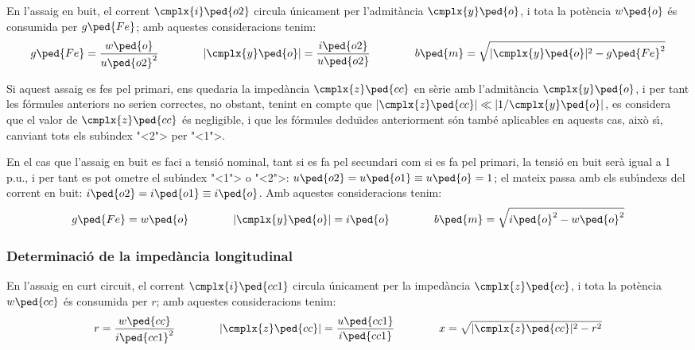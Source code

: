 En l'assaig en buit, el corrent $\cmplx{i}\ped{o2}$ circula
\'{u}nicament per l'admit\`{a}ncia $\cmplx{y}\ped{o}$, i tota la pot\`{e}ncia
$w\ped{o}$ \'{e}s consumida per $g\ped{Fe}$; amb aquestes consideracions
tenim:
\begin{equation}
    g\ped{Fe} = \frac{w\ped{o}}{u\ped{o2}^2} \qquad\qquad
    |\cmplx{y}\ped{o}| = \frac{i\ped{o2}}{u\ped{o2}}
    \qquad\qquad
    b\ped{m} = \sqrt{|\cmplx{y}\ped{o}|^2 - g\ped{Fe}^2}
\end{equation}

Si aquest assaig es fes pel primari, ens quedaria la imped\`{a}ncia
$\cmplx{z}\ped{cc}$ en s\`{e}rie amb l'admit\`{a}ncia $\cmplx{y}\ped{o}$, i
per tant les f\'{o}rmules anteriors no serien correctes, no obstant,
tenint en compte que $|\cmplx{z}\ped{cc}| \ll |1/\cmplx{y}\ped{o}|$,
es  considera que el valor de $\cmplx{z}\ped{cc}$ \'{e}s negligible, i
que les f\'{o}rmules dedu\"{\i}des anteriorment s\'{o}n tamb\'{e} aplicables en
aquests cas, aix\`{o} s\'{\i}, canviant tots els sub\'{\i}ndex {"<}2{">} per {"<}1{">}.

En el cas que l'assaig en buit es faci a tensi\'{o} nominal, tant  si es
fa pel secundari com si es fa pel primari, la tensi\'{o} en buit ser\`{a}
igual a 1 p.u., i per tant es pot ometre el sub\'{\i}ndex {"<}1{">} o {"<}2{">}:
$u\ped{o2} = u\ped{o1} \equiv u\ped{o} = 1$; el mateix passa amb els
sub\'{\i}ndexs del corrent en buit: $i\ped{o2} = i\ped{o1} \equiv
i\ped{o}$. Amb aquestes consideracions tenim:
\begin{equation}
    g\ped{Fe} = w\ped{o} \qquad\qquad
    |\cmplx{y}\ped{o}| = i\ped{o} \qquad\qquad
    b\ped{m} = \sqrt{i\ped{o}^2 - w\ped{o}^2}
\end{equation}

\subsubsection{Determinaci\'{o} de la imped\`{a}ncia longitudinal}

En l'assaig en curt circuit, el corrent $\cmplx{i}\ped{cc1}$ circula
\'{u}nicament per la imped\`{a}ncia $\cmplx{z}\ped{cc}$, i tota la pot\`{e}ncia
$w\ped{cc}$ \'{e}s consumida per $r$; amb aquestes consideracions tenim:
\begin{equation}
    r = \frac{w\ped{cc}}{i\ped{cc1}^2} \qquad\qquad
    |\cmplx{z}\ped{cc}| = \frac{u\ped{cc1}}{i\ped{cc1}} \qquad\qquad
    x = \sqrt{|\cmplx{z}\ped{cc}|^2 - r^2}
\end{equation}

